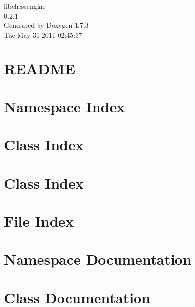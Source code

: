 \documentclass[a4paper]{book}
\begin{document}
\hypersetup{pageanchor=false}
\begin{titlepage}
\vspace*{7cm}
\begin{center}
{\Large libchessengine \\[1ex]\large 0.2.1 }\\
\vspace*{1cm}
{\large Generated by Doxygen 1.7.3}\\
\vspace*{0.5cm}
{\small Tue May 31 2011 02:45:37}\\
\end{center}
\end{titlepage}
\clearemptydoublepage
{}
\tableofcontents
\clearemptydoublepage
{}
\hypersetup{pageanchor=true}
\chapter{README}
\label{README}
\hypertarget{README}{}

\chapter{Namespace Index}

\chapter{Class Index}

\chapter{Class Index}

\chapter{File Index}

\chapter{Namespace Documentation}


\chapter{Class Documentation}






























\end{document}
